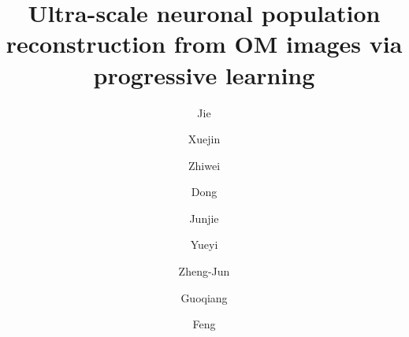 \documentclass[times,twocolumn,final]{elsarticle}
\begin{document}
	

\begin{frontmatter}

\title{Ultra-scale neuronal population reconstruction from OM images via progressive learning}                       

\author{Jie }
\author{Xuejin }
\author{Zhiwei  }
\author{Dong }
\author{Junjie  }
\author{Yueyi }
\author{Zheng-Jun }
\author{Guoqiang }
\author{Feng }

\address{National Engineering Laboratory for Brain-inspired Intelligence Technology and Application, University of Science and Technology of China, No. 96 Jinzhai Road, Hefei, Anhui, 230026, China} 



\end{frontmatter}
\end{document}
